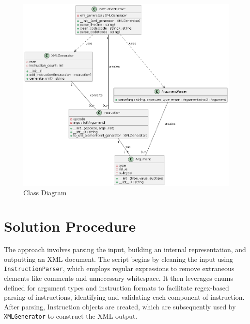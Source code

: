 \documentclass[10pt,a4paper]{article}
\newcommand{\code}[1]{\texttt{#1}}
\begin{document}
\begin{figure}[h]
    \centering
    \includegraphics[width=\textwidth]{imgs/classes.png}
    \caption{Class Diagram}
    \label{fig:classes}
    \end{figure}


\section{Solution Procedure}
The approach involves parsing the input, building an internal representation, and outputting an XML document. The script begins by cleaning the input using \code{InstructionParser}, which employs regular expressions to remove extraneous elements like comments and unnecessary whitespace. It then leverages enums defined for argument types and instruction formats to facilitate regex-based parsing of instructions, identifying and validating each component of
instruction. After parsing, Instruction objects are created, which are subsequently used by \code{XMLGenerator} to construct the XML output.
\end{document}
